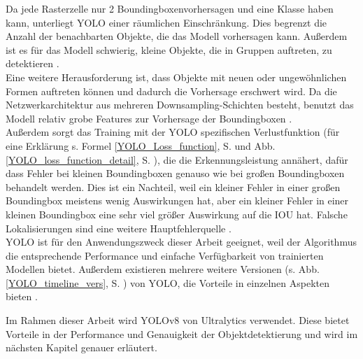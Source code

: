 {	Da jede Rasterzelle nur 2 Boundingboxenvorhersagen und eine Klasse haben kann, unterliegt YOLO einer räumlichen Einschränkung. Dies begrenzt die Anzahl der benachbarten Objekte, die das Modell vorhersagen kann. Außerdem ist es für das Modell schwierig, kleine Objekte, die in Gruppen auftreten, zu detektieren \citep{Redmon2016}. \\
	Eine weitere Herausforderung ist, dass Objekte mit neuen oder ungewöhnlichen Formen auftreten können und dadurch die Vorhersage erschwert wird. Da die Netzwerkarchitektur aus mehreren \glqq Downsampling\grqq{}-Schichten besteht, benutzt das Modell relativ grobe Features zur Vorhersage der Boundingboxen \citep{Redmon2016}. \\
	Außerdem sorgt das Training mit der YOLO spezifischen Verlustfunktion (für eine Erklärung s.  Formel \ref{YOLO_Loss_function}, S. \pageref{YOLO_Loss_function} und Abb.  \ref{YOLO_loss_function_detail}, S. \pageref{YOLO_loss_function_detail}), die die Erkennungsleistung annähert, dafür dass Fehler bei kleinen Boundingboxen genauso wie bei großen Boundingboxen behandelt werden. Dies ist ein Nachteil, weil ein kleiner Fehler in einer großen Boundingbox meistens wenig Auswirkungen hat, aber ein kleiner Fehler in einer kleinen Boundingbox eine sehr viel größer Auswirkung auf die IOU hat. Falsche Lokalisierungen sind eine weitere Hauptfehlerquelle \citep{Redmon2016}. \\
	YOLO ist für den Anwendungszweck dieser Arbeit geeignet, weil der Algorithmus die entsprechende Performance und einfache Verfügbarkeit von trainierten Modellen bietet. Außerdem existieren mehrere weitere Versionen (s. Abb. \ref{YOLO_timeline_vers}, S. \pageref{YOLO_timeline_vers}) von YOLO, die Vorteile in einzelnen Aspekten bieten \citep{Terven2023}. 

	Im Rahmen dieser Arbeit wird YOLOv8 von Ultralytics verwendet. Diese bietet Vorteile in der Performance und Genauigkeit der Objektdetektierung und wird im nächsten Kapitel genauer erläutert. 
	} 

